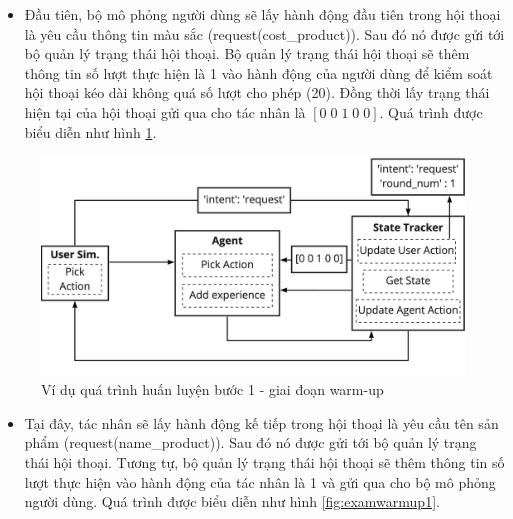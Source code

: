 \begin{itemize}
    \item Đầu tiên, bộ mô phỏng người dùng sẽ lấy hành động đầu tiên trong hội thoại là yêu cầu thông tin màu sắc (request(cost\_product)). Sau đó nó được gửi tới bộ quản lý trạng thái hội thoại. Bộ quản lý trạng thái hội thoại sẽ thêm thông tin số lượt thực hiện là 1 vào hành động của người dùng để kiểm soát hội thoại kéo dài không quá số lượt cho phép (20). Đồng thời lấy trạng thái hiện tại của hội thoại gửi qua cho tác nhân là $[0\; 0\; 1\; 0\; 0]$. Quá trình được biểu diễn như hình \ref{fig:examwarmup}.
\end{itemize}

\begin{center}
    \begin{figure}[h!]
        \begin{center}
         \includegraphics[scale=0.15]{chapter4/img/warmup_exam.jpg}
        \end{center}
        \caption{Ví dụ quá trình huấn luyện bước 1 - giai đoạn warm-up}
        \label{fig:examwarmup}
    \end{figure}
\end{center}

\begin{itemize}
    \item Tại đây, tác nhân sẽ lấy hành động kế tiếp trong hội thoại là yêu cầu tên sản phẩm (request(name\_product)). Sau đó nó được gửi tới bộ quản lý trạng thái hội thoại. Tương tự, bộ quản lý trạng thái hội thoại sẽ thêm thông tin số lượt thực hiện vào hành động của tác nhân là 1 và gửi qua cho bộ mô phỏng người dùng. Quá trình được biểu diễn như hình \ref{fig:examwarmup1}.
\end{itemize}

\clearpage

